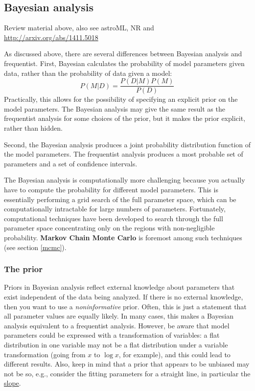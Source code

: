 \documentclass{article}
\begin{document}
\subsection{Bayesian analysis}
Review material above, also see astroML, NR and
\url{http://arxiv.org/abs/1411.5018}

As discussed above, there are several differences between Bayesian analysis
and frequentist. First, Bayesian calculates the probability of model
parameters given data, rather than the probability of data given a model:
$$ {P(M|D)} = \frac{P(D|M)P(M)}{P(D)} $$
Practically, this allows for the possibility of specifying an explicit
prior on the model parameters. The Bayesian analysis may give the same
result as the frequentist analysis for some choices of the prior, but
it makes the prior explicit, rather than hidden.

Second, the Bayesian analysis produces a joint probability
distribution function of the model parameters. The frequentist
analysis produces a most probable set of parameters and a set of
confidence intervals.

The Bayesian analysis is computationally more challenging because you
actually have to compute the probability for different model
parameters. This is essentially performing a grid search of the full
parameter space, which can be computationally intractable for large
numbers of parameters. Fortunately, computational techniques have been
developed to search through the full parameter space concentrating
only on the regions with non-negligible probability.
\textbf{Markov Chain Monte Carlo} is foremost among such techniques
(see section \ref{mcmc}).

\subsubsection{The prior}
Priors in Bayesian analysis reflect external knowledge about parameters that
exist independent of the data being analyzed. If there is no external
knowledge, then you want to use a \emph{noninformative} prior.  Often, this is
just a statement that all parameter values are equally likely.  In many cases,
this makes a Bayesian analysis equivalent to a frequentist analysis. However,
be aware that model parameters could be expressed with a transformation of
variables: a flat distribution in one variable may not be a flat distribution
under a variable transformation (going from $x$ to $\log{x}$, for example), and
this could lead to different results. Also, keep in mind that a prior that
appears to be unbiased may not be so, e.g., consider the fitting parameters for
a straight line, in particular the
\href{http://astronomy.nmsu.edu/holtz/a575/images/slope.png} {slope}.
\end{document}
